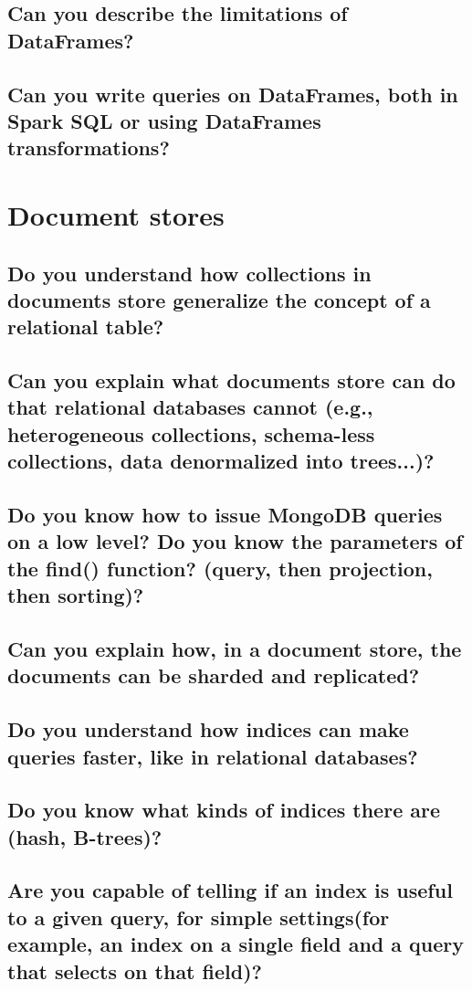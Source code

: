 \documentclass{article}
\begin{document}
\subsection{Can you describe the limitations of DataFrames?}
\subsection{Can you write queries on DataFrames, both in Spark SQL or using DataFrames transformations?}

\pagebreak

\section{Document stores}
\subsection{Do you understand how collections in documents store generalize the concept of a relational table?}



\subsection{Can you explain what documents store can do that relational databases cannot (e.g., heterogeneous collections, schema-less collections, data denormalized into trees...)?}
\subsection{Do you know how to issue MongoDB queries on a low level? Do you know the parameters of the find() function? (query, then projection, then sorting)?}
\subsection{Can you explain how, in a document store, the documents can be sharded and replicated?}
\subsection{Do you understand how indices can make queries faster, like in relational databases?}
\subsection{Do you know what kinds of indices there are (hash, B-trees)?}
\subsection{Are you capable of telling if an index is useful to a given query, for simple settings(for example, an index on a single field and a query that selects on that field)?}
\end{document}
